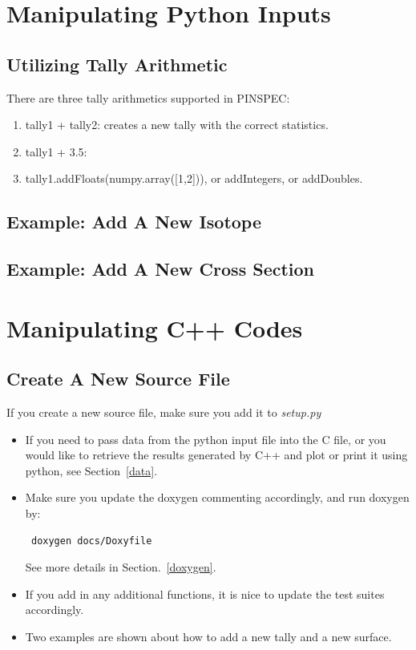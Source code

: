 \documentclass[titlepage]{article}
\begin{document}
\clearpage
\section{Manipulating Python Inputs}\label{python}
\subsection{Utilizing Tally Arithmetic}
There are three tally arithmetics supported in PINSPEC: 
\begin{enumerate}
\item tally1 + tally2: creates a new tally with the correct statistics. 
\item tally1 + 3.5:
\item tally1.addFloats(numpy.array([1,2])), or addIntegers, or addDoubles. 
\end{enumerate}


\clearpage
\subsection{Example: Add A New Isotope}

\clearpage
\subsection{Example: Add A New Cross Section}






\clearpage
\section{Manipulating C++ Codes}\label{C++}
\subsection{Create A New Source File}
If you create a new source file, make sure you add it to \textit{setup.py}

\begin{itemize}
\item If you need to pass data from the python input file into the C file, or you would like to retrieve the results generated by C++ and plot or print it using python, see Section~\ref{data}. 
\item Make sure you update the doxygen commenting accordingly, and run doxygen by:
\begin{verbatim}
 doxygen docs/Doxyfile
\end{verbatim}
See more details in Section.~\ref{doxygen}. 

\item If you add in any additional functions, it is nice to update the test suites accordingly. 

\item Two examples are shown about how to add a new tally and a new surface. 
\end{itemize}
\end{document}
